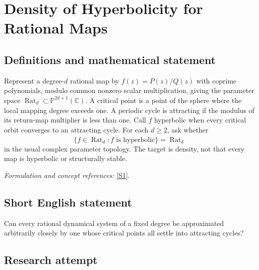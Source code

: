\documentclass[11pt,a4paper]{article}
\newcommand{\C}{\mathbb{C}}
\newcommand{\PP}{\mathbb P}
\newcommand{\sref}[2]{\hyperlink{source:#1:#2}{[S#2]}}
\newif\ifshowcatalogue
\newcommand{\cataloguescope}[1]{\ifshowcatalogue
 \paragraph{Exact scope in the supplied catalogue.}
 \begin{quote}\small #1\end{quote}\fi}
\numberwithin{equation}{section}
\begin{document}
\setcounter{section}{154}
\clearpage
\section{\texorpdfstring{Density of Hyperbolicity for Rational Maps}{Density of Hyperbolicity for Rational Maps}}\label{155}
\subsection{Definitions and mathematical statement}
Represent a degree-$d$ rational map by $f(z)=P(z)/Q(z)$ with coprime polynomials, modulo common nonzero scalar multiplication, giving the parameter space $\operatorname{Rat}_d\subset\PP^{2d+1}(\C)$. A critical point is a point of the sphere where the local mapping degree exceeds one. A periodic cycle is attracting if the modulus of its return-map multiplier is less than one. Call $f$ hyperbolic when every critical orbit converges to an attracting cycle. For each $d\ge2$, ask whether
\[
 \overline{\{f\in\operatorname{Rat}_d:f\text{ is hyperbolic}\}}=\operatorname{Rat}_d
\]
in the usual complex parameter topology. The target is density, not that every map is hyperbolic or structurally stable.
\par\smallskip\textit{Formulation and concept references:} \sref{155}{1}.
\cataloguescope{Determine whether hyperbolic rational maps, whose critical points are all attracted to attracting periodic cycles, are dense in the space of rational maps of the Riemann sphere of each fixed degree d >= 2.}
\subsection{Short English statement}
Can every rational dynamical system of a fixed degree be approximated arbitrarily closely by one whose critical points all settle into attracting cycles?
\subsection{Research attempt}
\end{document}
